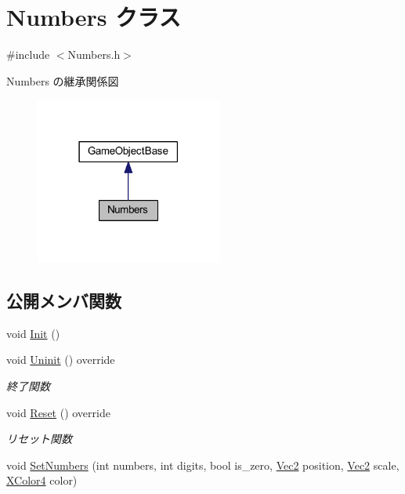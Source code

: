 \hypertarget{class_numbers}{}\section{Numbers クラス}
\label{class_numbers}


{\ttfamily \#include $<$Numbers.\+h$>$}



Numbers の継承関係図\nopagebreak
\begin{figure}[H]
\begin{center}
\leavevmode
\includegraphics[width=174pt]{class_numbers__inherit__graph}
\end{center}
\end{figure}
\subsection*{公開メンバ関数}
\begin{DoxyCompactItemize}
\item 
void \mbox{\hyperlink{class_numbers_a42158aa8dbb71308161c642aed8752e8}{Init}} ()
\item 
void \mbox{\hyperlink{class_numbers_aeaad3cc1b8ae7defe79813b983b04101}{Uninit}} () override
\begin{DoxyCompactList}\small\item\em 終了関数 \end{DoxyCompactList}\item 
void \mbox{\hyperlink{class_numbers_a1ab67e439ba1695c8fd545dfc1650990}{Reset}} () override
\begin{DoxyCompactList}\small\item\em リセット関数 \end{DoxyCompactList}\item 
void \mbox{\hyperlink{class_numbers_aeb51ecf4e148f4ca67ac7788e061f94d}{Set\+Numbers}} (int numbers, int digits, bool is\+\_\+zero, \mbox{\hyperlink{_vector3_d_8h_a5ef6e95dfc5f9d3820b71772d99bbc25}{Vec2}} position, \mbox{\hyperlink{_vector3_d_8h_a5ef6e95dfc5f9d3820b71772d99bbc25}{Vec2}} scale, \mbox{\hyperlink{_vector3_d_8h_a680c30c4a07d86fe763c7e01169cd6cc}{X\+Color4}} color)
\end{DoxyCompactItemize}
